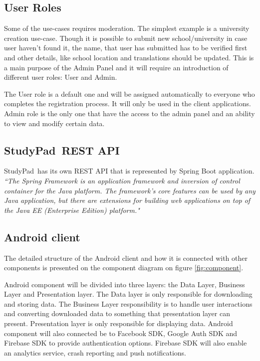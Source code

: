 \documentclass[thesis=B,english]{FITthesis}[2012/10/20]
\newcommand{\appname}{StudyPad}
\newcommand{\quoting}[1]{\textit{``#1"}}
\begin{document}
\subsection{User Roles}
Some of the use-cases requires moderation. The simplest example is a university creation use-case. Though it is possible to submit new school/university in case user haven't found it, the name, that user has submitted has to be verified first and other details, like school location and translations should be updated. This is a main purpose of the Admin Panel and it will require an introduction of different user roles: User and Admin. 

The User role is a default one and will be assigned automatically to everyone who completes the registration process. It will only be used in the client applications.
Admin role is the only one that have the access to the admin panel and an ability to view and modify certain data.

\subsection{\appname\ REST API}
\appname\ has its own REST API that is represented by Spring Boot application. \cite{studypad-backend} \quoting{The Spring Framework is an application framework and inversion of control container for the Java platform. The framework's core features can be used by any Java application, but there are extensions for building web applications on top of the Java EE (Enterprise Edition) platform.} \cite{wiki-spring}

\subsection{Android client}

The detailed structure of the Android client and how it is connected with other components is presented on the component diagram on figure \ref{fig:component}. 

 Android component will be divided into three layers: the Data Layer, Business Layer and Presentation layer. The Data layer is only responsible for downloading and storing data. The Business Layer responsibility is to handle user interactions and converting downloaded data to something that presentation layer can present. Presentation layer is only responsible for displaying data. Android component will also connected be to Facebook SDK, Google Auth SDK and Firebase SDK to provide authentication options. Firebase SDK will also enable an analytics service, crash reporting and push notifications.
\end{document}
